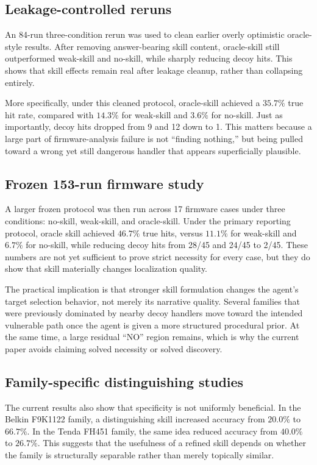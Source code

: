 \documentclass[11pt]{article}
\begin{document}
\subsection{Leakage-controlled reruns}

An 84-run three-condition rerun was used to clean earlier overly optimistic oracle-style
results.  After removing answer-bearing skill content, oracle-skill still outperformed
weak-skill and no-skill, while sharply reducing decoy hits.  This shows that skill
effects remain real after leakage cleanup, rather than collapsing entirely.

More specifically, under this cleaned protocol, oracle-skill achieved a $35.7\%$ true
hit rate, compared with $14.3\%$ for weak-skill and $3.6\%$ for no-skill.  Just as
importantly, decoy hits dropped from 9 and 12 down to 1.  This matters because a large
part of firmware-analysis failure is not ``finding nothing,'' but being pulled toward a
wrong yet still dangerous handler that appears superficially plausible.

\subsection{Frozen 153-run firmware study}

A larger frozen protocol was then run across 17 firmware cases under three conditions:
no-skill, weak-skill, and oracle-skill.  Under the primary reporting protocol, oracle
skill achieved $46.7\%$ true hits, versus $11.1\%$ for weak-skill and $6.7\%$ for
no-skill, while reducing decoy hits from 28/45 and 24/45 to 2/45.  These numbers are
not yet sufficient to prove strict necessity for every case, but they do show that skill
materially changes localization quality.

The practical implication is that stronger skill formulation changes the agent's target
selection behavior, not merely its narrative quality.  Several families that were
previously dominated by nearby decoy handlers move toward the intended vulnerable path
once the agent is given a more structured procedural prior.  At the same time, a large
residual ``NO'' region remains, which is why the current paper avoids claiming solved
necessity or solved discovery.

\subsection{Family-specific distinguishing studies}

The current results also show that specificity is not uniformly beneficial.  In the
Belkin F9K1122 family, a distinguishing skill increased accuracy from $20.0\%$ to
$66.7\%$.  In the Tenda FH451 family, the same idea reduced accuracy from $40.0\%$ to
$26.7\%$.  This suggests that the usefulness of a refined skill depends on whether the
family is structurally separable rather than merely topically similar.
\end{document}
